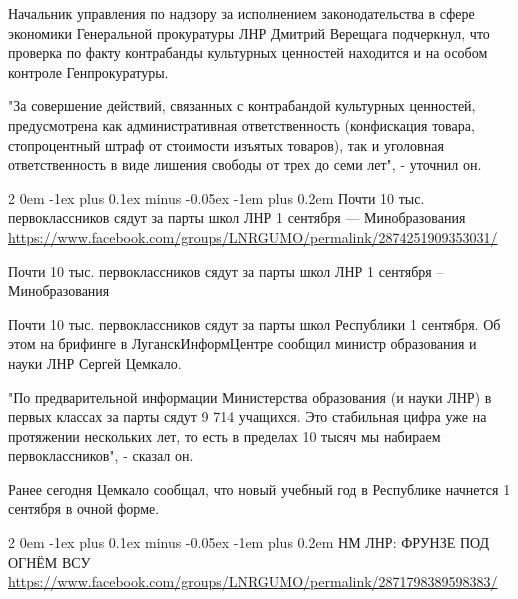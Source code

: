 \documentclass[a4paper,11pt]{extreport}
\makeatletter
\renewcommand\subsection{%
  \clearpage
    \@startsection{subsection}%
    {2}%
    {0em}%
    {-1ex plus 0.1ex minus -0.05ex}%
    {-1em plus 0.2em}%
    {\scshape\bfseries\Large}%
}
\makeatother
\begin{document}
Начальник управления по надзору за исполнением законодательства в сфере
экономики Генеральной прокуратуры ЛНР Дмитрий Верещага подчеркнул, что проверка
по факту контрабанды культурных ценностей находится и на особом контроле
Генпрокуратуры.

"За совершение действий, связанных с контрабандой культурных ценностей,
предусмотрена как административная ответственность (конфискация товара,
стопроцентный штраф от стоимости изъятых товаров), так и уголовная
ответственность в виде лишения свободы от трех до семи лет", - уточнил он.

  
 
 
\subsection{Почти 10 тыс. первоклассников сядут за парты школ ЛНР 1 сентября --- Минобразования}
\label{sec:24_07_2020.fb.lnr.2}
\url{https://www.facebook.com/groups/LNRGUMO/permalink/2874251909353031/}

Почти 10 тыс. первоклассников сядут за парты школ ЛНР 1 сентября –
Минобразования

Почти 10 тыс. первоклассников сядут за парты школ Республики 1 сентября. Об
этом на брифинге в ЛуганскИнформЦентре сообщил министр образования и науки ЛНР
Сергей Цемкало.

"По предварительной информации Министерства образования (и науки ЛНР) в первых
классах за парты сядут 9 714 учащихся. Это стабильная цифра уже на протяжении
нескольких лет, то есть в пределах 10 тысяч мы набираем первоклассников", -
сказал он.

Ранее сегодня Цемкало сообщал, что новый учебный год в Республике начнется 1
сентября в очной форме.
  
 
 
\subsection{НМ ЛНР: ФРУНЗЕ ПОД ОГНЁМ ВСУ}
\label{sec:24_07_2020.fb.lnr.3}
\url{https://www.facebook.com/groups/LNRGUMO/permalink/2871798389598383/}
\end{document}

